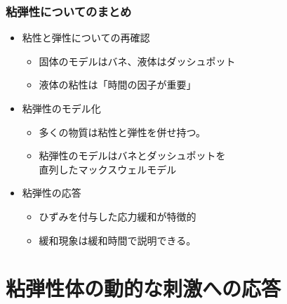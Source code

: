 \documentclass[unicode,12pt]{beamer}%
\begin{document}
\begin{frame}
	\frametitle{粘弾性についてのまとめ}
        \begin{boxnote}
            \vspace{-3mm}
            \begin{itemize}
                \item 粘性と弾性についての再確認
                    \begin{itemize}
                        \item 固体のモデルはバネ、液体はダッシュポット
                        \item 液体の粘性は「時間の因子が重要」
                    \end{itemize} 
                \item 粘弾性のモデル化
                    \begin{itemize}
                        \item 多くの物質は粘性と弾性を併せ持つ。
                        \item 粘弾性のモデルはバネとダッシュポットを\\直列したマックスウェルモデル
                    \end{itemize} 
                \item 粘弾性の応答
                    \begin{itemize}
                        \item ひずみを付与した応力緩和が特徴的
                        \item 緩和現象は緩和時間で説明できる。
                    \end{itemize}
            \end{itemize}
        \end{boxnote}
\end{frame}

\section{粘弾性体の動的な刺激への応答}
\end{document}
